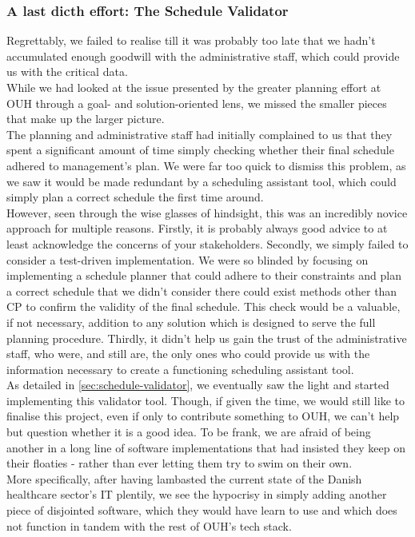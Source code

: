 \subsubsection*{A last dicth effort: The Schedule Validator}
Regrettably, we failed to realise till it was probably too late that we hadn't accumulated enough goodwill with the administrative staff, which could provide us with the critical data. 
\\
While we had looked at the issue presented by the greater planning effort at OUH through a goal- and solution-oriented lens, we missed the smaller pieces that make up the larger picture.
\\
The planning and administrative staff had initially complained to us that they spent a significant amount of time simply checking whether their final schedule adhered to management's plan. We were far too quick to dismiss this problem, as we saw it would be made redundant by a scheduling assistant tool, which could simply plan a correct schedule the first time around.
\\
However, seen through the wise glasses of hindsight, this was an incredibly novice approach for multiple reasons. Firstly, it is probably always good advice to at least acknowledge the concerns of your stakeholders. Secondly, we simply failed to consider a test-driven implementation. We were so blinded by focusing on implementing a schedule planner that could adhere to their constraints and plan a correct schedule that we didn't consider there could exist methods other than CP to confirm the validity of the final schedule. This check would be a valuable, if not necessary, addition to any solution which is designed to serve the full planning procedure. Thirdly, it didn't help us gain the trust of the administrative staff, who were, and still are, the only ones who could provide us with the information necessary to create a functioning scheduling assistant tool. 
\\
As detailed in \autoref{sec:schedule-validator}, we eventually saw the light and started implementing this validator tool. Though, if given the time, we would still like to finalise this project, even if only to contribute something to OUH, we can't help but question whether it is a good idea. To be frank, we are afraid of being another in a long line of software implementations that had insisted they keep on their floaties - rather than ever letting them try to swim on their own.
\\
More specifically, after having lambasted the current state of the Danish healthcare sector's IT plentily, we see the hypocrisy in simply adding another piece of disjointed software, which they would have learn to use and which does not function in tandem with the rest of OUH's tech stack.